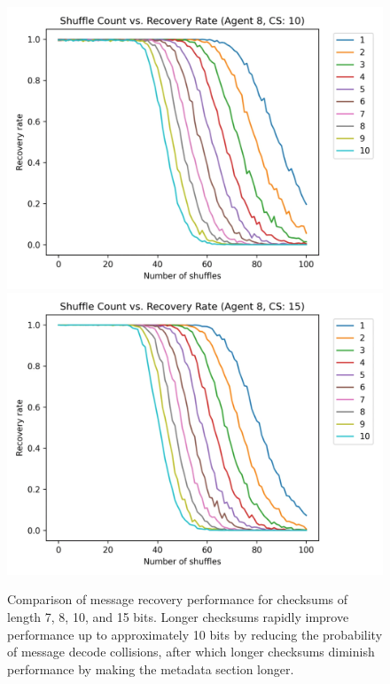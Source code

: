\documentclass[titlepage]{article}
\begin{document}
\begin{figure}
{\includegraphics[width=0.45\paperwidth]{figures/checksum_10.png}
\includegraphics[width=0.45\paperwidth]{figures/checksum_15.png}
}
\caption{Comparison of message recovery performance for checksums of length 7, 8, 10, and 15 bits. Longer checksums rapidly improve performance up to approximately 10 bits by reducing the probability of message decode collisions, after which longer checksums diminish performance by making the metadata section longer.}
\end{figure}
\end{document}

